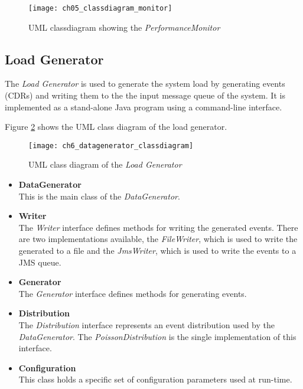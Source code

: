 \begin{figure}[htbp]
	\centering
	\texttt{[image: ch05\_classdiagram\_monitor]}
	\caption{\ac{UML} classdiagram showing the \emph{PerformanceMonitor}}
	\label{fig:ch05_classdiagram_monitor}
\end{figure}

\subsection{Load Generator}

The \emph{Load Generator} is used to generate the system load by generating events (\acp{CDR}) and writing them to the the input message queue of the system. It is implemented as a stand-alone Java program using a command-line interface.

Figure \ref{fig:ch5_datagenerator_classdiagram} shows the \ac{UML} class diagram of the load generator.

\begin{figure}[htpb]
	\centering
	\texttt{[image: ch6\_datagenerator\_classdiagram]}
	\caption{\ac{UML} class diagram of the \emph{Load Generator}}
	\label{fig:ch5_datagenerator_classdiagram}
\end{figure}

\begin{itemize}
	\item \textbf{DataGenerator}\\
	This is the main class of the \emph{DataGenerator}.
	\item \textbf{Writer}\\
	The \emph{Writer} interface defines methods for writing the generated events. There are two implementations available, the \emph{FileWriter}, which is used to write the generated to a file and the \emph{JmsWriter}, which is used to write the events to a \ac{JMS} queue.
	\item \textbf{Generator}\\
	The \emph{Generator} interface defines methods for generating events.  
	\item \textbf{Distribution}\\
	The \emph{Distribution} interface represents an event distribution used by the \emph{DataGenerator}. The \emph{PoissonDistribution} is the single implementation of this interface.
	\item \textbf{Configuration}\\
	This class holds a specific set of configuration parameters used at run-time.
\end{itemize}

